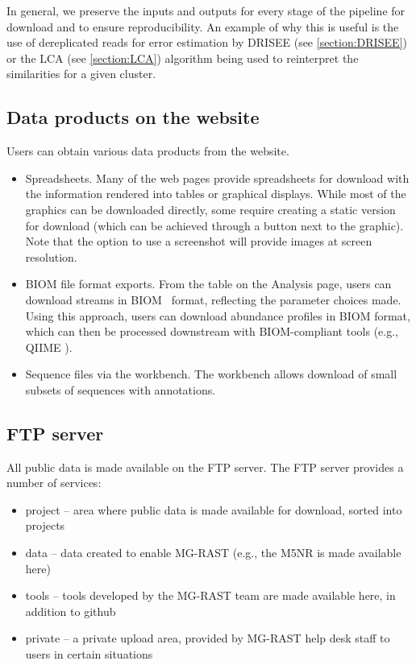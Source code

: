 \documentclass[12pt,fullpage]{report}
\begin{document}
In general, we preserve the inputs and outputs for every stage of the pipeline for download and to ensure reproducibility.
An example of why this is useful is the use of dereplicated reads for error estimation by DRISEE (see \ref{section:DRISEE}) or the LCA (see \ref{section:LCA}) algorithm being used to reinterpret the similarities for a given cluster.

\subsection{Data products on the website}

Users can obtain 
various data products from the website.
\begin{itemize}
\item
Spreadsheets.
Many of the web pages provide spreadsheets for download with the information rendered into tables or
graphical displays.
While most of the graphics can be downloaded directly, some require creating a static version for download (which can be achieved through a button next to the graphic).
Note that the option to use a screenshot will provide images at screen resolution.
\item
BIOM file format exports.
From the table on the Analysis page, users can download streams in BIOM~\cite{BIOM} format, reflecting the parameter choices made.
Using this approach, users can download abundance profiles in BIOM format, which can then be processed downstream with BIOM-compliant tools (e.g., QIIME \cite{QIIME}).
\item
Sequence files via the workbench.
The workbench allows download of small subsets of sequences with annotations.
\end{itemize}

\subsection{FTP server}

All public data is made available on the FTP server.
The FTP server provides a number of services:

\begin{itemize}
\item project --
area where public data is made available for download, sorted into projects

\item data --
data created to enable MG-RAST (e.g., the M5NR is made available here)

\item tools --
tools developed by the MG-RAST team are made available here, in addition to github

\item private --
a private upload area, provided by MG-RAST help desk staff to users in certain situations

\end{itemize}
\end{document}
